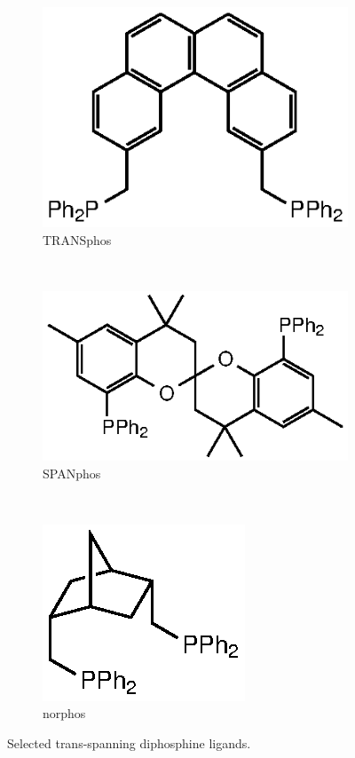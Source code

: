\begin{figure}[htbp]
\centering
\begin{subfigure}[b]{0.3\textwidth}
	\centering
	\includegraphics{../Figures/Diphosphines/TRANSphos.eps}
	\caption{TRANSphos}
	\label{TRANSphos}
\end{subfigure}
~~~
\begin{subfigure}[b]{0.3\textwidth}
	\centering
	\includegraphics{../Figures/Diphosphines/SPANphos.eps}
	\caption{SPANphos}
	\label{SPANphos}
\end{subfigure}
~~~
\begin{subfigure}[b]{0.3\textwidth}
	\centering
	\includegraphics{../Figures/Diphosphines/norphos.eps}
	\caption{norphos}
	\label{norphos}
\end{subfigure}
\caption[Trans-spanning diphosphine ligands]{Selected trans-spanning diphosphine ligands.}
\label{transdiphosphines}
\end{figure}


